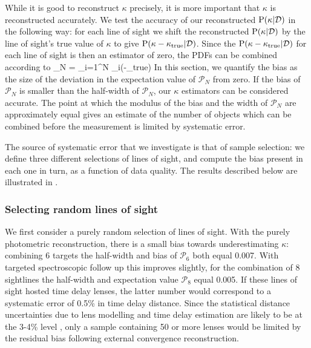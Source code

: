 \documentclass[useAMS,usenatbib]{mn2e}
\begin{document}
While it is good to reconstruct $\kappa$ precisely, it is more important that
$\kappa$ is reconstructed accurately. 
We test the accuracy of our reconstructed ${\rm P}(\kappa|{\mathcal{D}})$ in the following
way: for each line of sight we shift the reconstructed ${\rm P}(\kappa|{\mathcal{D}})$ by
the line of sight's true value of $\kappa$ to give
${\rm P}(\kappa-\kappa_{\rm true}|{\mathcal{D}})$. Since the ${\rm P}(\kappa-\kappa_{\rm true}|{\mathcal{D}})$ for
each line of sight is then an \independant estimator of zero, the PDFs can be
combined according to
\be
\label{eq:bias}
_N = \prod_{i=1}^N \pr_i(\kappa-\kappa_{\rm true})
\ee
In this section, we quantify the bias as the size of the deviation in the
expectation value of $\mathcal{P}_N$ from zero. If the bias of $\mathcal{P}_N$
is smaller than the half-width of $\mathcal{P}_N$, our $\kappa$ estimators can
be considered accurate. 
The point at which the modulus of the bias and the width of $\mathcal{P}_N$
are approximately equal gives an estimate of the number of objects which can
be combined before the measurement is limited by systematic error.


The source of systematic error that we investigate  is that of sample
selection: we define three different selections of lines of sight, and compute
the bias present in each one in turn, as a function of data quality. The
results described below are illustrated in .


\subsubsection{Selecting random lines of sight}
\label{sec:bias:random}

We first consider a purely random selection of lines of sight. With the purely
photometric reconstruction, there is a small bias towards underestimating
$\kappa$: combining 6 targets the half-width and bias of $\mathcal{P}_{6}$
both equal 0.007. With targeted spectroscopic follow up this improves
slightly, for the combination of 8 sightlines the half-width and expectation
value  $\mathcal{P}_{8}$ equal 0.005.  If these lines of sight hosted time
delay lenses, the latter number would correspond to a systematic error of
0.5\% in time delay distance. Since the statistical distance uncertainties due
to lens modelling and time delay estimation are likely to be at the 3-4\%
level \citep{SuyuEtal2010},  only a sample containing 50 or more lenses would
be limited by the residual bias  following external convergence
reconstruction.
\end{document}
